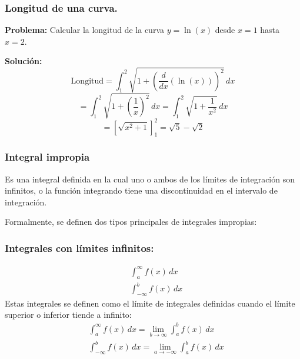 \subsubsection{Longitud de una curva.}
\begin{example}    
    \textbf{Problema:} Calcular la longitud de la curva \( y = \ln(x) \) desde \( x = 1 \) hasta \( x = 2 \).
    
    \textbf{Solución:}
    \[
    \text{Longitud} = \int_1^2 \sqrt{1 + \left(\frac{d}{dx}(\ln(x))\right)^2} \, dx
    \]
    \[
    = \int_1^2 \sqrt{1 + \left(\frac{1}{x}\right)^2} \, dx = \int_1^2 \sqrt{1 + \frac{1}{x^2}} \, dx
    \]
    \[
    = \left[ \sqrt{x^2 + 1} \right]_1^2 = \sqrt{5} - \sqrt{2}
    \]
    
    \begin{center}
    \end{center}
    \end{example}


\subsubsection{Integral impropia}

\begin{definition}
    Es una integral definida en la cual uno o ambos de los límites de integración son infinitos, o la función integrando tiene una discontinuidad en el intervalo de integración.
\end{definition}
Formalmente, se definen dos tipos principales de integrales impropias:

\subsubsection{Integrales con límites infinitos:}
\begin{align}
    &\int_{a}^{\infty} f(x) \, dx \\
    &\int_{-\infty}^{b} f(x) \, dx
\end{align}
Estas integrales se definen como el límite de integrales definidas cuando el límite superior o inferior tiende a infinito:
\begin{align}
    &\int_{a}^{\infty} f(x) \, dx = \lim_{b \to \infty} \int_{a}^{b} f(x) \, dx\\
    &\int_{-\infty}^{b} f(x) \, dx = \lim_{a \to -\infty} \int_{a}^{b} f(x) \, dx
\end{align}

